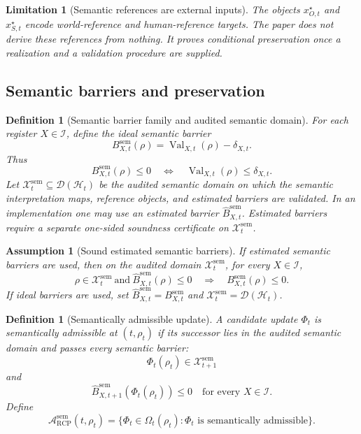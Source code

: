 \documentclass[11pt]{article}
\newtheorem{definition}[theorem]{Definition}
\newtheorem{assumption}[theorem]{Assumption}
\newtheorem{limitation}[theorem]{Limitation}
\newcommand{\D}{\mathcal{D}}
\newcommand{\Hcal}{\mathcal{H}}
\newcommand{\Acal}{\mathcal{A}}
\newcommand{\Xcal}{\mathcal{X}}
\newcommand{\1}{\mathbf{1}}
\newcommand{\RCP}{\mathrm{RCP}}
\newcommand{\Val}{\operatorname{Val}}
\providecommand{\Ical}{\mathcal{I}}
\providecommand{\sem}{\mathrm{sem}}
\begin{document}
\begin{limitation}[Semantic references are external inputs]
The objects \(x^{\star}_{O,t}\) and \(x^{\star}_{S,t}\) encode world-reference and human-reference targets.  The paper does not derive these references from nothing.  It proves conditional preservation once a realization and a validation procedure are supplied.
\end{limitation}

\subsection{Semantic barriers and preservation}

\begin{definition}[Semantic barrier family and audited semantic domain]
\label{def:semantic_barrier_family}
For each register \(X\in\Ical\), define the ideal semantic barrier
\[
B^{\sem}_{X,t}(\rho)
=
\Val_{X,t}(\rho)-\delta_{X,t}.
\]
Thus
\[
B^{\sem}_{X,t}(\rho)\le0
\quad\Longleftrightarrow\quad
\Val_{X,t}(\rho)\le\delta_{X,t}.
\]
Let \(\Xcal^{\sem}_t\subseteq\D(\Hcal_t)\) be the audited semantic domain on which the semantic interpretation maps, reference objects, and estimated barriers are validated.  In an implementation one may use an estimated barrier \(\widehat B^{\sem}_{X,t}\).  Estimated barriers require a separate one-sided soundness certificate on \(\Xcal_t^{\sem}\).
\end{definition}

\begin{assumption}[Sound estimated semantic barriers]
\label{ass:sound_estimated_semantic_barriers}
If estimated semantic barriers are used, then on the audited domain \(\Xcal^{\sem}_t\), for every \(X\in\Ical\),
\[
\rho\in\Xcal_t^{\sem}
\ \text{and}\
\widehat B^{\sem}_{X,t}(\rho)\le0
\quad\Longrightarrow\quad
B^{\sem}_{X,t}(\rho)\le0.
\]
If ideal barriers are used, set \(\widehat B^{\sem}_{X,t}=B^{\sem}_{X,t}\) and \(\Xcal_t^{\sem}=\D(\Hcal_t)\).
\end{assumption}

\begin{definition}[Semantically admissible update]
\label{def:semantically_admissible_update}
A candidate update \(\Phi_t\) is semantically admissible at \((t,\rho_t)\) if its successor lies in the audited semantic domain and passes every semantic barrier:
\[
\Phi_t(\rho_t)\in\Xcal_{t+1}^{\sem}
\]
and
\[
\widehat B^{\sem}_{X,t+1}(\Phi_t(\rho_t))\le0
\quad\text{for every }X\in\Ical.
\]
Define
\[
\Acal^{\sem}_{\RCP}(t,\rho_t)
=
\{\Phi_t\in\Omega_t(\rho_t):\Phi_t\text{ is semantically admissible}\}.
\]
\end{definition}
\end{document}
